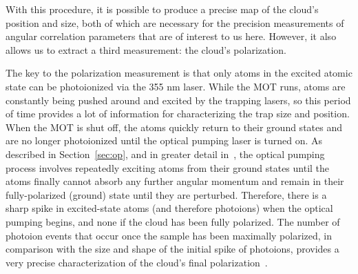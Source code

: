 

With this procedure, it is possible to produce a precise map of the cloud's position and size, both of which are necessary for the precision measurements of angular correlation parameters that are of interest to us here.  However, it also allows us to extract a third measurement:  the cloud's polarization.

The key to the polarization measurement is that only atoms in the excited atomic state can be photoionized via the 355 nm laser.  While the MOT runs, atoms are constantly being pushed around and excited by the trapping lasers, so this period of time provides a lot of information for characterizing the trap size and position.  When the MOT is shut off, the atoms quickly return to their ground states and are no longer photoionized until the optical pumping laser is turned on.  As described in Section~\ref{sec:op}, and in greater detail in~\cite{ben_OP}, the optical pumping process involves repeatedly exciting atoms from their ground states until the atoms finally cannot absorb any further angular momentum and remain in their fully-polarized (ground) state until they are perturbed.  Therefore, there is a sharp spike in excited-state atoms (and therefore photoions) when the optical pumping begins, and none if %
the cloud has been fully polarized.  The number of photoion events that occur once the sample has been maximally polarized, in comparison with the size and shape of the initial spike of photoions, provides a very precise characterization of the cloud's final polarization~\cite{ben_OP}.



